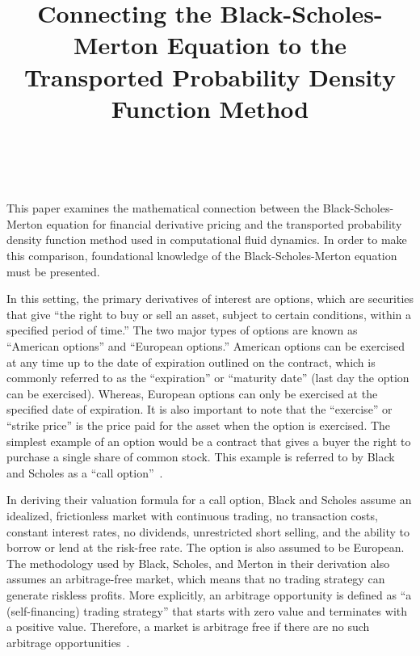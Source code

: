 \documentclass[12pt, onecolumn, journal]{IEEEtran}
\begin{document}
\title{\LARGE Connecting the Black-Scholes-Merton Equation to the Transported Probability Density Function Method}

\author{
     \\
}

\maketitle
\vspace{-24pt}

This paper examines the mathematical connection between the Black-Scholes-Merton equation for financial derivative pricing and the transported probability density function method used in computational fluid dynamics. In order to make this comparison, foundational knowledge of the Black-Scholes-Merton equation must be presented.

In this setting, the primary derivatives of interest are options, which are securities that give “the right to buy or sell an asset, subject to certain conditions, within a specified period of time.” The two major types of options are known as “American options” and “European options.” American options can be exercised at any time up to the date of expiration outlined on the contract, which is commonly referred to as the “expiration” or “maturity date” (last day the option can be exercised). Whereas, European options can only be exercised at the specified date of expiration. It is also important to note that the “exercise” or “strike price” is the price paid for the asset when the option is exercised. The simplest example of an option would be a contract that gives a buyer the right to purchase a single share of common stock. This example is referred to by Black and Scholes as a “call option”~\cite{BlackScholes1973}.

In deriving their valuation formula for a call option, Black and Scholes assume an idealized, frictionless market with continuous trading, no transaction costs, constant interest rates, no dividends, unrestricted short selling, and the ability to borrow or lend at the risk-free rate. The option is also assumed to be European. The methodology used by Black, Scholes, and Merton in their derivation also assumes an arbitrage-free market, which means that no trading strategy can generate riskless profits. More explicitly, an arbitrage opportunity is defined as “a (self-financing) trading strategy” that starts with zero value and terminates with a positive value. Therefore, a market is arbitrage free if there are no such arbitrage opportunities~\cite{BaxterRennie1996}.
\end{document}
